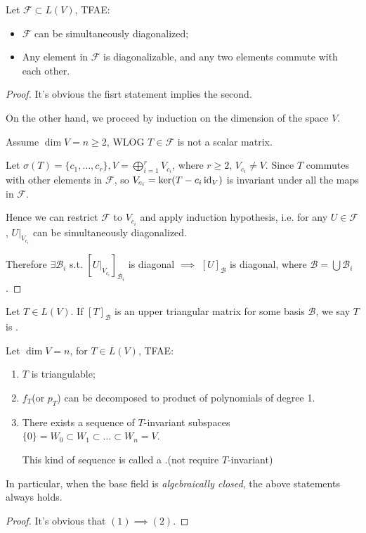 \begin{proposition}
	Let $\mathcal{F} \subset L(V)$, TFAE:
	\begin{itemize}
		\item $\mathcal{F}$ can be simultaneously diagonalized;
		\item Any element in $\mathcal{F}$ is diagonalizable, and any two elements
			commute with each other.
	\end{itemize}
\end{proposition}
\begin{proof}[Proof]
    It's obvious the fisrt statement implies the second.

	On the other hand, we proceed by induction on the dimension of the space $V$.

	Assume  $\dim V = n\ge 2$, WLOG $T\in \mathcal{F}$ is not a scalar matrix.

	Let $\sigma(T)=\{c_1,\dots,c_r\}, V=\bigoplus_{i=1}^r V_{c_i}$, where $r\ge 2$,
	$V_{c_i}\ne V$.
	Since $T$ commutes with other elements in  $\mathcal{F}$,
	so $V_{c_i} = \ker(T - c_i\operatorname{id}_V)$ is invariant under all the maps in $\mathcal{F}$.

	Hence we can restrict $\mathcal{F}$ to $V_{c_i}$ and apply
	induction hypothesis, i.e. for any $U\in \mathcal{F}$, $U|_{V_{c_i}}$ can
	be simultaneously diagonalized.

	Therefore $\exists \mathcal{B}_i$ s.t. $[U|_{V_{c_i}}]_{\mathcal{B}_i}$ is diagonal
	$\implies$  $[U]_{\mathcal{B}}$ is diagonal, where $\mathcal{B}=\bigcup \mathcal{B}_i$.
\end{proof}

\begin{definition}
	Let $T\in L(V)$. If $[T]_{\mathcal{B}}$ is an upper
	triangular matrix for some basis $\mathcal{B}$,
	we say $T$ is .
\end{definition}

\begin{proposition}
	Let $\dim V=n$, for  $T\in L(V)$, TFAE:
	\begin{enumerate}
		\item $T$ is triangulable;
		\item  $f_T$(or $p_T$) can be decomposed to product of polynomials of degree 1.
		\item There exists a sequence of $T$-invariant subspaces
			$\{0\}=W_0 \subset W_1 \subset\dots \subset W_n = V$.

			This kind of sequence is called a .(not require $T$-invariant)
	\end{enumerate}
\end{proposition}
\begin{remark}
	In particular, when the base field is \textit{algebraically closed}, the above
	statements always holds.
\end{remark}
\begin{proof}[Proof]
	It's obvious that $(1) \implies (2)$.
\end{proof}

